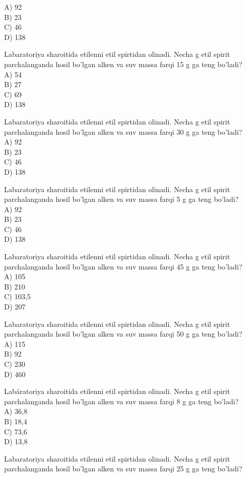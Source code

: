 A) 92\\
B) 23\\
C) 46\\
D) 138
  \item Labaratoriya sharoitida etilenni etil spirtidan olinadi. Necha g etil spirit parchalanganda hosil bo'lgan alken va suv massa farqi 15 g ga teng bo'ladi?\\
A) 54\\
B) 27\\
C) 69\\
D) 138
  \item Labaratoriya sharoitida etilenni etil spirtidan olinadi. Necha g etil spirit parchalanganda hosil bo'lgan alken va suv massa farqi 30 g ga teng bo'ladi?\\
A) 92\\
B) 23\\
C) 46\\
D) 138
  \item Labaratoriya sharoitida etilenni etil spirtidan olinadi. Necha g etil spirit parchalanganda hosil bo'lgan alken va suv massa farqi 5 g ga teng bo'ladi?\\
A) 92\\
B) 23\\
C) 46\\
D) 138
  \item Labaratoriya sharoitida etilenni etil spirtidan olinadi. Necha g etil spirit parchalanganda hosil bo'lgan alken va suv massa farqi 45 g ga teng bo'ladi?\\
A) 105\\
B) 210\\
C) 103,5\\
D) 207
  \item Labaratoriya sharoitida etilenni etil spirtidan olinadi. Necha g etil spirit parchalanganda hosil bo'lgan alken va suv massa farqi 50 g ga teng bo'ladi?\\
A) 115\\
B) 92\\
C) 230\\
D) 460
  \item Labáratoriya sharoitida etilenni etil spirtidan olinadi. Necha g etil spirit parchalanganda hosil bo'lgan alken va suv massa farqi 8 g ga teng bo'ladi?\\
A) 36,8\\
B) 18,4\\
C) 73,6\\
D) 13,8
  \item Labaratoriya sharoitida etilenni etil spirtidan olinadi. Necha g etil spirit parchalanganda hosil bo'lgan alken va suv massa farqi 25 g ga teng bo'ladi?\\
